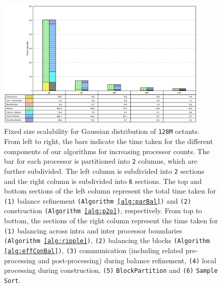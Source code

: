 \begin{figure}
  \begin{center}
    \includegraphics[width=0.9\textwidth]{images/fs128}
  \end{center}
  \caption{Fixed size scalability for Gaussian distribution of
  {\tt128M} octants. From left to right, the bars indicate the time
  taken for the different components of our algorithms for increasing
  processor counts. The bar for each processor is partitioned into
  {\tt2} columns, which are further subdivided. The left column is
  subdivided into {\tt2} sections and the right column is subdivided
  into {\tt6} sections. The top and bottom sections of the left column
  represent the total time taken for {\tt(1)} balance refinement
  {\tt(Algorithm \ref{alg:parBal})} and {\tt(2)} construction
  {\tt(Algorithm \ref{alg:p2o})}, respectively. From top to bottom,
  the sections of the right column represent the time taken for
  {\tt(1)} balancing across intra and inter processor boundaries
  {\tt(Algorithm \ref{alg:ripple})}, {\tt(2)} balancing the blocks
  {\tt(Algorithm \ref{alg:effConBal})}, {\tt(3)} communication
  (including related pre-processing and post-processing) during
  balance refinement, {\tt(4)} local processing during construction,
  {\tt(5)} {\tt BlockPartition} and {\tt(6)} {\tt Sample Sort}.}
  \label{fig:fsL}
\end{figure}



